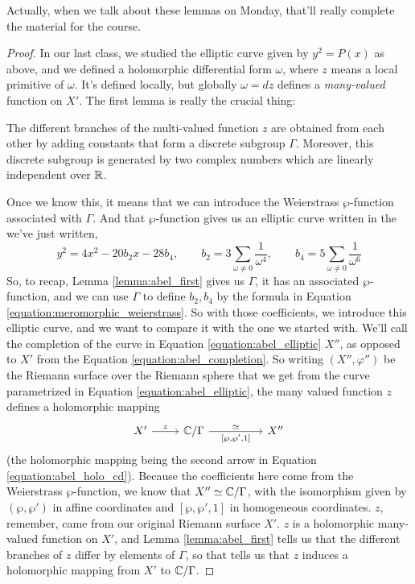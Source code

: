 \documentclass{article}
\begin{document}
Actually, when we talk about these lemmas on Monday, that'll really complete the material for the course.
\begin{proof}

In our last class, we studied the elliptic curve given by \(y^2 = P(x)\) as above, and we defined a holomorphic differential form \(\omega\), where \(z\) means a local primitive of \(\omega\). It's defined locally, but globally \(\omega = dz\) defines a \textit{many-valued} function on \(X'\). The first lemma is really the crucial thing:
\begin{lemma}
The different branches of the multi-valued function \(z\) are obtained from each other by adding constants that form a discrete subgroup \(\Gamma\). Moreover, this discrete subgroup is generated by two complex numbers which are linearly independent over \(\mathbb{R}\).
\label{lemma:abel_first}
\end{lemma}

Once we know this, it means that we can introduce the Weierstrass \(\wp\)-function associated with \(\Gamma\). And that \(\wp\)-function gives us an elliptic curve written in the we've just written,
\begin{equation}
  y^2 = 4x^2 - 20b_2x - 28b_4, \qquad b_2 = 3\sum_{\omega \neq 0}\frac{1}{\omega^4}, \qquad b_4 = 5\sum_{\omega \neq 0}\frac{1}{\omega^6}
  \label{equation:abel_elliptic}
\end{equation}
So, to recap, Lemma \ref{lemma:abel_first} gives us \(\Gamma\), it has an associated \(\wp\)-function, and we can use \(\Gamma\) to define \(b_2, b_4\) by the formula in Equation \ref{equation:meromorphic_weierstrass}. So with those coefficients, we introduce this elliptic curve, and we want to compare it with the one we started with.
We'll call the completion of the curve in Equation \ref{equation:abel_elliptic} \(X''\), as opposed to \(X'\) from the Equation \ref{equation:abel_completion}.
So writing \((X'', \varphi'')\) be the Riemann surface over the Riemann sphere that we get from the curve parametrized in Equation \ref{equation:abel_elliptic}, the many valued function \(z\) defines a holomorphic mapping
\begin{equation}
\begin{tikzcd}
  X' \arrow[r, "z"] & \mbb{C}/\Gamma \arrow{rr}{\simeq}[swap]{[\wp, \wp', 1]} && X''
\end{tikzcd}
\label{equation:abel_holo_cd}
\end{equation}
(the holomorphic mapping being the second arrow in Equation \ref{equation:abel_holo_cd}). Because the coefficients here come from the Weierstrass \(\wp\)-function, we know that \(X'' \simeq \mathbb{C}/\Gamma\), with the isomorphism given by \((\wp, \wp')\) in affine coordinates and \([\wp, \wp', 1]\) in homogeneous coordinates. \(z\), remember, came from our original Riemann surface \(X'\). \(z\) is a holomorphic many-valued function on \(X'\),
and Lemma \ref{lemma:abel_first} tells us that the different branches of \(z\) differ by elements of \(\Gamma\), so that tells us that \(z\) induces a holomorphic mapping from \(X'\) to \(\mathbb{C}/\Gamma\).


\end{proof}
\end{document}
